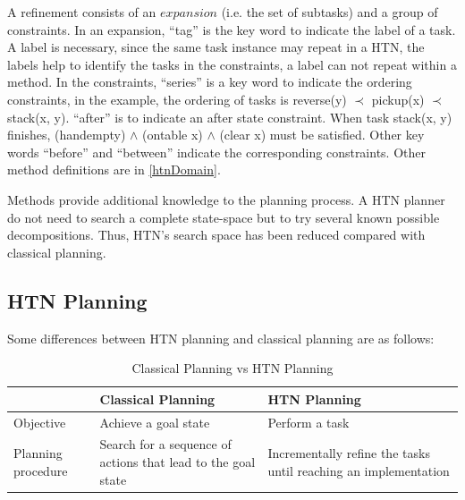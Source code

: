 A refinement consists of an $expansion$ (i.e. the set of subtasks) and a group of constraints. In an expansion, “tag” is the key word to indicate the label of a task. A label is necessary, since the same task instance may repeat in a HTN, the labels help to identify the tasks in the constraints, a label can not repeat within a method. In the constraints, “series” is a key word to indicate the ordering constraints, in the example, the ordering of tasks is reverse(y) $\prec$ pickup(x) $\prec$ stack(x, y). “after” is to indicate an after state constraint. When task stack(x, y) finishes, (handempty) $\wedge$ (ontable x) $\wedge$ (clear x) must be satisfied. Other key words “before” and “between” indicate the corresponding constraints. Other method definitions are in \autoref{htnDomain}.

Methods provide additional knowledge to the planning process. A HTN planner do not need to search a complete state-space but to try several known possible decompositions. Thus, HTN’s search space has been reduced compared with classical planning.

\subsection{HTN Planning}

Some differences between HTN planning and classical planning are as follows:

\begin{table}[h]
    \begin{center}
    \begin{tabular}{|p{1.7cm}|p{4.5cm}|p{5cm}|}%
    \hline
    & Classical Planning & HTN Planning \\
    \hline
    Objective & Achieve a goal state & Perform a task \\
    \hline
    Planning procedure & Search for a sequence of actions that lead to the goal state & Incrementally refine the tasks until reaching an implementation \\
    \hline
    \end{tabular}
    \end{center}
    \caption{Classical Planning vs HTN Planning}
\end{table}

